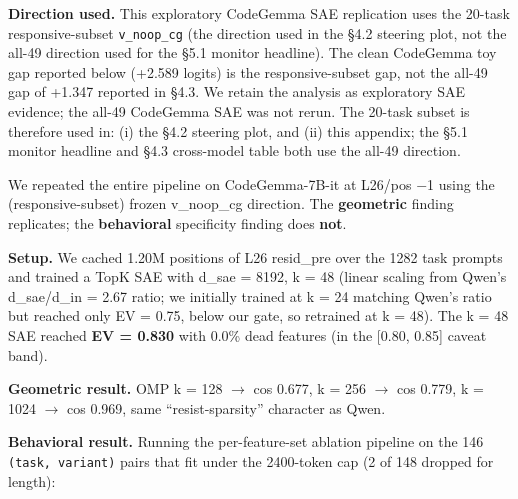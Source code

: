 \documentclass[
  11pt,
  a4paper]{article}
\begin{document}
\textbf{Direction used.} This exploratory CodeGemma SAE replication uses
the 20-task responsive-subset \texttt{v\_noop\_cg} (the direction used
in the \S{}4.2 steering plot, not the all-49 direction used for the \S{}5.1
monitor headline). The clean CodeGemma toy gap reported below (+2.589
logits) is the responsive-subset gap, not the all-49 gap of +1.347
reported in \S{}4.3. We retain the analysis as exploratory SAE evidence;
the all-49 CodeGemma SAE was not rerun. The 20-task subset is therefore
used in: (i) the \S{}4.2 steering plot, and (ii) this appendix; the \S{}5.1
monitor headline and \S{}4.3 cross-model table both use the all-49
direction.

We repeated the entire pipeline on CodeGemma-7B-it at L26/pos \ensuremath{-}1 using
the (responsive-subset) frozen v\_noop\_cg direction. The
\textbf{geometric} finding replicates; the \textbf{behavioral}
specificity finding does \textbf{not}.

\textbf{Setup.} We cached 1.20M positions of L26 resid\_pre over the
1282 task prompts and trained a TopK SAE with d\_sae = 8192, k = 48
(linear scaling from Qwen's d\_sae/d\_in = 2.67 ratio; we initially
trained at k = 24 matching Qwen's ratio but reached only EV = 0.75,
below our gate, so retrained at k = 48). The k = 48 SAE reached
\textbf{EV = 0.830} with 0.0\% dead features (in the {[}0.80, 0.85{]}
caveat band).

\textbf{Geometric result.} OMP k = 128 \ensuremath{\rightarrow} cos 0.677, k = 256 \ensuremath{\rightarrow} cos 0.779,
k = 1024 \ensuremath{\rightarrow} cos 0.969, same ``resist-sparsity'' character as Qwen.

\textbf{Behavioral result.} Running the per-feature-set ablation
pipeline on the 146 \texttt{(task,\ variant)} pairs that fit under the
2400-token cap (2 of 148 dropped for length):
\end{document}
